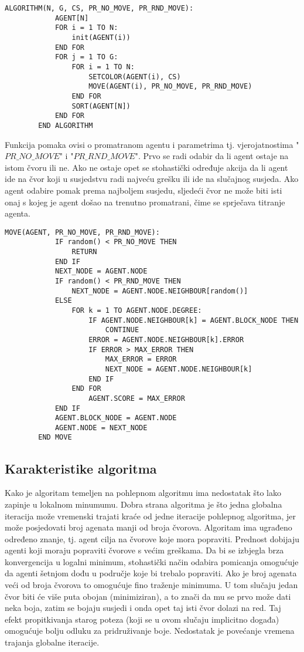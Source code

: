 \documentclass[times, utf8, diplomski, numeric]{fer}
\begin{document}
\begin{singlespace}
	\begin{lstlisting}[caption=Pseudok\^{o}d agentskog algoritma]
		ALGORITHM(N, G, CS, PR_NO_MOVE, PR_RND_MOVE):
			AGENT[N]
			FOR i = 1 TO N:
				init(AGENT(i))
			END FOR
			FOR j = 1 TO G:
				FOR i = 1 TO N:
					SETCOLOR(AGENT(i), CS)
					MOVE(AGENT(i), PR_NO_MOVE, PR_RND_MOVE)
				END FOR
				SORT(AGENT[N])
			END FOR
		END ALGORITHM
	\end{lstlisting}
\end{singlespace}

Funkcija pomaka ovisi o promatranom agentu i parametrima tj. vjerojatnostima "$PR\_NO\_MOVE$" i "$PR\_RND\_MOVE$". Prvo se radi odabir da li agent ostaje na istom čvoru ili ne. Ako ne ostaje opet se stohastički određuje akcija da li agent ide na čvor koji u susjedstvu radi najveću grešku ili ide na slučajnog susjeda. Ako agent odabire pomak prema najboljem susjedu, sljedeći čvor ne može biti isti onaj s kojeg je agent došao na trenutno promatrani, čime se sprječava titranje agenta.

\begin{singlespace}
	\begin{lstlisting}[caption=Detalji funkcije pomaka - MOVE]
		MOVE(AGENT, PR_NO_MOVE, PR_RND_MOVE):
			IF random() < PR_NO_MOVE THEN
				RETURN
			END IF
			NEXT_NODE = AGENT.NODE
			IF random() < PR_RND_MOVE THEN
				NEXT_NODE = AGENT.NODE.NEIGHBOUR[random()]
			ELSE
				FOR k = 1 TO AGENT.NODE.DEGREE:
					IF AGENT.NODE.NEIGHBOUR[k] = AGENT.BLOCK_NODE THEN
						CONTINUE
					ERROR = AGENT.NODE.NEIGHBOUR[k].ERROR
					IF ERROR > MAX_ERROR THEN
						MAX_ERROR = ERROR
						NEXT_NODE = AGENT.NODE.NEIGHBOUR[k]
					END IF
				END FOR
					AGENT.SCORE = MAX_ERROR
			END IF
			AGENT.BLOCK_NODE = AGENT.NODE
			AGENT.NODE = NEXT_NODE
		END MOVE
	\end{lstlisting}
\end{singlespace}

\subsection{Karakteristike algoritma}

Kako je algoritam temeljen na pohlepnom algoritmu ima nedostatak što lako zapinje u lokalnom minumumu. Dobra strana algoritma je što jedna globalna iteracija može vremenski trajati kraće od jedne iteracije pohlepnog algoritma, jer može posjedovati broj agenata manji od broja čvorova. Algoritam ima ugrađeno određeno znanje, tj. agent cilja na čvorove koje mora popraviti. Prednost dobijaju agenti koji moraju popraviti čvorove s većim greškama. Da bi se izbjegla brza konvergencija u logalni minimum, stohastički način odabira pomicanja omogućuje da agenti šetnjom dođu u područje koje bi trebalo popraviti. Ako je broj agenata veći od broja čvorova to omogućuje fino traženje minimuma. U tom slučaju jedan čvor biti će više puta obojan (minimiziran), a to znači da mu se prvo može dati neka boja, zatim se bojaju susjedi i onda opet taj isti čvor dolazi na red. Taj efekt propitkivanja starog poteza (koji se u ovom slučaju implicitno događa) omogućuje bolju odluku za pridruživanje boje. Nedostatak je povećanje vremena trajanja globalne iteracije.
\end{document}
